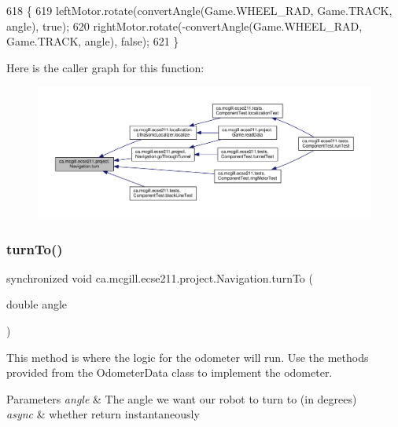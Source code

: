 \begin{DoxyCode}
618                               \{
619     leftMotor.rotate(convertAngle(Game.WHEEL\_RAD, Game.TRACK, angle), \textcolor{keyword}{true});
620     rightMotor.rotate(-convertAngle(Game.WHEEL\_RAD, Game.TRACK, angle), \textcolor{keyword}{false});
621   \}
\end{DoxyCode}
Here is the caller graph for this function\+:
\nopagebreak
\begin{figure}[H]
\begin{center}
\leavevmode
\includegraphics[width=350pt]{classca_1_1mcgill_1_1ecse211_1_1project_1_1_navigation_ad74286ad36d333bfaf57661837457b76_icgraph}
\end{center}
\end{figure}
\mbox{\label{classca_1_1mcgill_1_1ecse211_1_1project_1_1_navigation_a3bbe0645f2b3b3d0986b4a707fb5a00c}} 
\subsubsection{\texorpdfstring{turn\+To()}{turnTo()}}
{\footnotesize\ttfamily synchronized void ca.\+mcgill.\+ecse211.\+project.\+Navigation.\+turn\+To (\begin{DoxyParamCaption}\item[{double}]{angle }\end{DoxyParamCaption})}

This method is where the logic for the odometer will run. Use the methods provided from the Odometer\+Data class to implement the odometer.


\begin{DoxyParams}{Parameters}
{\em angle} & The angle we want our robot to turn to (in degrees) \\
\hline
{\em async} & whether return instantaneously \\
\hline
\end{DoxyParams}


